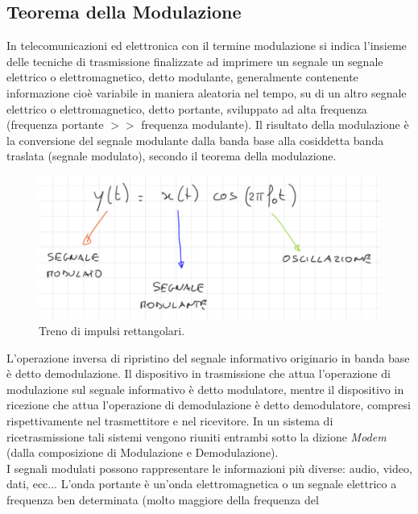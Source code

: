 \documentclass[12pt,oneside,openany]{memoir}
\numberwithin{equation}{subsection}
\begin{document}

\newpage
\subsection{Teorema della Modulazione}
In telecomunicazioni ed elettronica con il termine modulazione si indica
l'insieme delle tecniche di trasmissione finalizzate ad imprimere un segnale un
segnale elettrico o elettromagnetico, detto modulante, generalmente contenente
informazione cio\`e variabile in maniera aleatoria nel tempo, su di un altro
segnale elettrico o elettromagnetico, detto portante, sviluppato ad alta
frequenza (frequenza portante $>>$ frequenza modulante). Il risultato della
modulazione \`e la conversione del segnale modulante dalla banda base alla
cosiddetta banda traslata (segnale modulato), secondo il teorema della
modulazione.
\begin{figure}[H]
	\centering
	\captionsetup{justification=centering}
	\includegraphics[width=1.0\textwidth]{images/modulato_modulante_oscillazione.png}
	\caption{Treno di impulsi rettangolari.}
\end{figure}
L'operazione inversa di ripristino del segnale informativo originario in banda
base \`e detto demodulazione. Il dispositivo in trasmissione che attua
l'operazione di modulazione sul segnale informativo \`e detto modulatore, mentre
il dispositivo in ricezione che attua l'operazione di demodulazione \`e detto
demodulatore, compresi rispettivamente nel trasmettitore e nel ricevitore. In
un sistema di ricetrasmissione tali sistemi vengono riuniti entrambi sotto la
dizione \textit{Modem} (dalla composizione di Modulazione e Demodulazione).\\
I segnali modulati possono rappresentare le informazioni pi\`u diverse: audio,
video, dati, ecc... L'onda portante \`e un'onda elettromagnetica o un segnale
elettrico a frequenza ben determinata (molto maggiore della frequenza del
\end{document}
